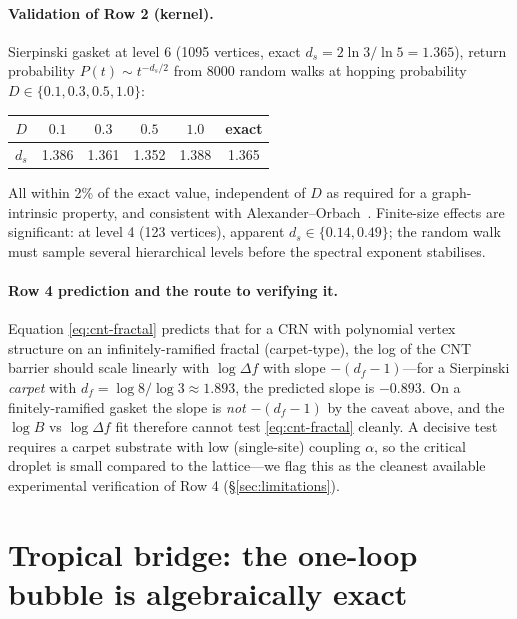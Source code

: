 \documentclass[11pt,a4paper]{article}
\theoremstyle{plain}
\begin{document}
\paragraph{Validation of Row 2 (kernel).}
Sierpinski gasket at level 6 (1095 vertices, exact
$d_s = 2\ln 3/\ln 5 = 1.365$), return probability
$P(t) \sim t^{-d_s/2}$ from 8000 random walks at hopping
probability $D \in \{0.1, 0.3, 0.5, 1.0\}$:
\begin{center}\small
\begin{tabular}{@{}cccccc@{}}\toprule
$D$ & $0.1$ & $0.3$ & $0.5$ & $1.0$ & exact \\ \midrule
$d_s$ & 1.386 & 1.361 & 1.352 & 1.388 & 1.365 \\ \bottomrule
\end{tabular}
\end{center}
All within 2\% of the exact value, independent of $D$ as required
for a graph-intrinsic property, and consistent with
Alexander--Orbach~\citep{AlexanderOrbach}.  Finite-size effects
are significant: at level 4 (123 vertices), apparent $d_s \in
\{0.14, 0.49\}$; the random walk must sample several hierarchical
levels before the spectral exponent stabilises.

\paragraph{Row 4 prediction and the route to verifying it.}
Equation \eqref{eq:cnt-fractal} predicts that for a CRN with
polynomial vertex structure on an infinitely-ramified fractal
(carpet-type), the log of the CNT barrier should scale linearly
with $\log \Delta f$ with slope $-(d_f - 1)$---for a Sierpinski
\emph{carpet} with $d_f = \log 8/\log 3 \approx 1.893$, the
predicted slope is $-0.893$.  On a finitely-ramified gasket the
slope is \emph{not} $-(d_f - 1)$ by the caveat above, and the
$\log B$ vs $\log \Delta f$ fit therefore cannot test
\eqref{eq:cnt-fractal} cleanly.  A decisive test requires a
carpet substrate with low (single-site) coupling $\alpha$, so the
critical droplet is small compared to the lattice---we flag this
as the cleanest available experimental verification of Row 4
(\S\ref{sec:limitations}).

\section{Tropical bridge: the one-loop bubble is algebraically exact}
\label{sec:tropical}
\end{document}
